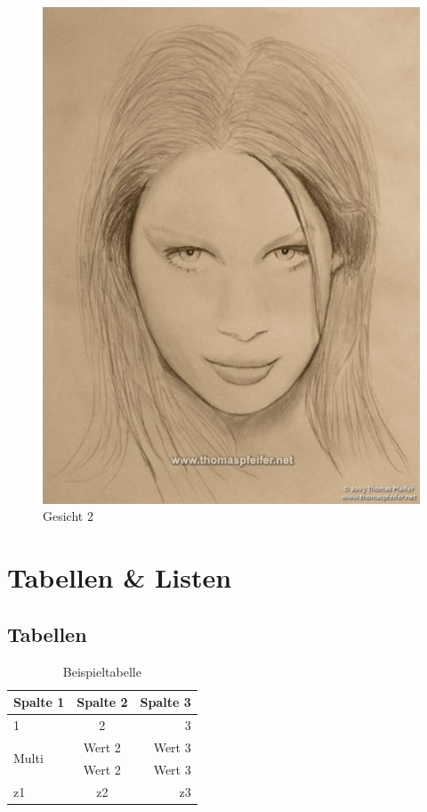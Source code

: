 \begin{figure}[h]
\begin{minipage}[h]{5cm}
			\includegraphics[width=1\textwidth]{bilder.jpg}
		\caption{Gesicht 2}
		\label{fig:Gesicht2}
	\end{minipage}
\end{figure}

\lipsum[1]

\section{Tabellen \& Listen}
\label{sec:TabellenListen}

\subsection{Tabellen}
\label{sec:Tabellen}

\begin{table}[h]
	\centering
		\begin{tabular}{|l|c|r|}
			\hline
			\textbf{Spalte 1} & \textbf{Spalte 2} & \textbf{Spalte 3}\\
			\hline
			1 & 2 & 3 \\
			\hline
			\multirow{2}{*}{Multi}
				& Wert 2 & Wert 3 \\
				& Wert 2 & Wert 3 \\
			\hline
			z1 & z2 & z3 \\
			\hline
		\end{tabular}
	\caption{Beispieltabelle}
	\label{tab:Beispieltabelle}
\end{table}

